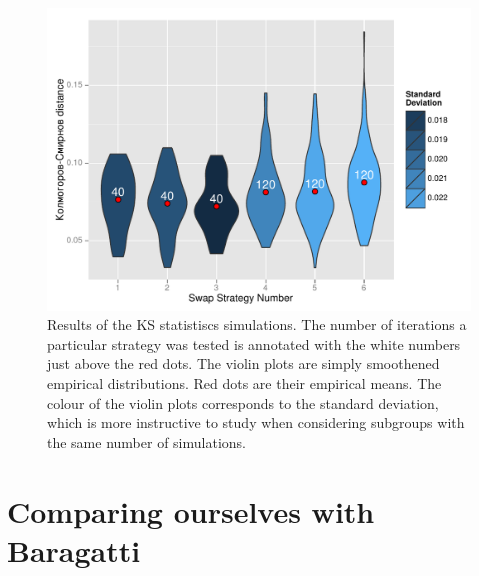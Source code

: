 \documentclass{book}
\begin{document}
\begin{figure}[ht]
	\centering \includegraphics[width=\textwidth,keepaspectratio=TRUE]{./img/KSobs.pdf}
	\caption{Results of the KS statistiscs simulations. The number of iterations a particular strategy was tested is annotated with the white numbers just above the red dots. The violin plots are simply smoothened empirical distributions. Red dots are their empirical means. The colour of the violin plots corresponds to the standard deviation, which is more instructive to study when considering subgroups with the same number of simulations.}\label{KSdistancePlot}
\end{figure}


\section{Comparing ourselves with Baragatti}
\end{document}
